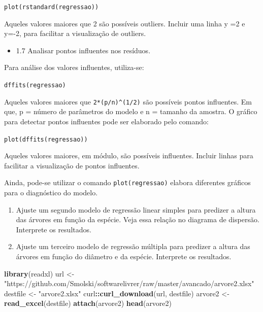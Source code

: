 \documentclass[12pt,brazil,oneside]{book}
\newenvironment{Shaded}{\begin{snugshade}}{\end{snugshade}}
\newcommand{\KeywordTok}[1]{\textcolor[rgb]{0.13,0.29,0.53}{\textbf{#1}}}
\newcommand{\NormalTok}[1]{#1}
\newcommand{\OperatorTok}[1]{\textcolor[rgb]{0.81,0.36,0.00}{\textbf{#1}}}
\newcommand{\StringTok}[1]{\textcolor[rgb]{0.31,0.60,0.02}{#1}}
\providecommand{\tightlist}{%
  \setlength{\itemsep}{0pt}\setlength{\parskip}{0pt}}
\begin{document}
\texttt{plot(rstandard(regressao))}

Aqueles valores maiores que \textbar{}2\textbar{} são possíveis
outliers. Incluir uma linha y =2 e y=-2, para facilitar a visualização
de outliers.

\begin{itemize}
\tightlist
\item
  1.7 Analisar pontos influentes nos resíduos.
\end{itemize}

Para análise dos valores influentes, utiliza-se:

\texttt{dffits(regressao)}

Aqueles valores maiores que \texttt{2*(p/n)\^{}(1/2)} são possíveis
pontos influentes. Em que, p = número de parâmetros do modelo e n =
tamanho da amostra. O gráfico para detectar pontos influentes pode ser
elaborado pelo comando:

\texttt{plot(dffits(regressao))}

Aqueles valores maiores, em módulo, são possíveis influentes. Incluir
linhas para facilitar a visualização de pontos influentes.

Ainda, pode-se utilizar o comando \texttt{plot(regressao)} elabora
diferentes gráficos para o diagnóstico do modelo.

\begin{enumerate}
\def\labelenumi{\arabic{enumi})}
\setcounter{enumi}{1}
\item
  Ajuste um segundo modelo de regressão linear simples para predizer a
  altura das árvores em função da espécie. Veja essa relação no diagrama
  de dispersão. Interprete os resultados.
\item
  Ajuste um terceiro modelo de regressão múltipla para predizer a altura
  das árvores em função do diâmetro e da espécie. Interprete os
  resultados.
\end{enumerate}

\begin{Shaded}
\begin{Highlighting}[]
\KeywordTok{library}\NormalTok{(readxl)}
\NormalTok{url <-}\StringTok{ "https://github.com/Smolski/softwarelivrer/raw/master/avancado/arvore2.xlsx"}
\NormalTok{destfile <-}\StringTok{ "arvore2.xlsx"}
\NormalTok{curl}\OperatorTok{::}\KeywordTok{curl_download}\NormalTok{(url, destfile)}
\NormalTok{arvore2 <-}\StringTok{ }\KeywordTok{read_excel}\NormalTok{(destfile)}
\KeywordTok{attach}\NormalTok{(arvore2)}
\KeywordTok{head}\NormalTok{(arvore2)}
\end{Highlighting}
\end{Shaded}
\end{document}
